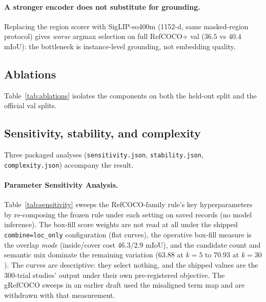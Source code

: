 \paragraph{A stronger encoder does not substitute for grounding.} Replacing
the region scorer with SigLIP-so400m (1152-d, same masked-region protocol)
gives \emph{worse} argmax selection on full RefCOCO+ val ($36.5$ vs $40.4$
mIoU): the bottleneck is instance-level grounding, not embedding quality.

\subsection{Ablations}
\label{sec:ablations}
Table~\ref{tab:ablations} isolates the components on both the held-out split
and the official val splits.

\begin{table}[t]\centering\small
\caption{Component ablations. Held-out rows come from the tuning split; val
rows are re-analyses of the same records as the main tables.}
\label{tab:ablations}

\end{table}

\subsection{Sensitivity, stability, and complexity}
\label{sec:analysis}
Three packaged analyses (\texttt{sensitivity.json}, \texttt{stability.json},
\texttt{complexity.json}) accompany the result.

\paragraph{Parameter Sensitivity Analysis.}
Table~\ref{tab:sensitivity} sweeps the RefCOCO-family rule's key
hyperparameters by re-composing the frozen rule under each setting on saved
records (no model inference). The box-fill score weights are not read at all
under the shipped \texttt{combine=loc\_only} configuration (flat curves), the
operative box-fill measure is the overlap \emph{mode} (inside/cover cost
$46.3$/$2.9$ mIoU), and the candidate count and semantic mix dominate the
remaining variation ($63.88$ at $k{=}5$ to $70.93$ at $k{=}30$). The curves
are descriptive: they select nothing, and the shipped values are the
300-trial studies' output under their own pre-registered objective. The
gRefCOCO sweeps in an earlier draft used the misaligned term map and are
withdrawn with that measurement.

